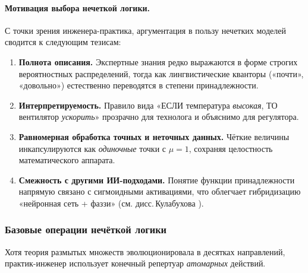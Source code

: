 \paragraph{Мотивация выбора нечеткой логики.}
С точки зрения инженера-практика, аргументация
в пользу нечетких моделей сводится к следующим тезисам:
\begin{enumerate}
  \item \textbf{Полнота описания.}  
    Экспертные знания редко выражаются в форме
    строгих вероятностных распределений,  
    тогда как лингвистические кванторы («почти», «довольно»)  
    естественно переводятся в степени принадлежности.
  \item \textbf{Интерпретируемость.}  
    Правило вида
    «ЕСЛИ температура \emph{высокая}, ТО вентилятор \emph{ускорить}»
    прозрачно для технолога и объяснимо для регулятора.
  \item \textbf{Равномерная обработка точных и неточных данных.}  
    Чёткие величины инкапсулируются как \emph{одиночные} точки
    с $\mu\!=\!1$, сохраняя целостность математического аппарата.
  \item \textbf{Смежность с другими ИИ-подходами.}  
    Понятие функции принадлежности напрямую связано с сигмоидными
    активациями, что облегчает гибридизацию
    «нейронная сеть + фаззи» (см. дисс.\,Кулабухова \cite{kulabukhov2023}).
\end{enumerate}

\subsubsection{Базовые операции нечёткой логики}
Хотя теория размытых множеств эволюционировала в десятках направлений,
практик-инженер использует конечный репертуар \emph{атомарных} действий.  


